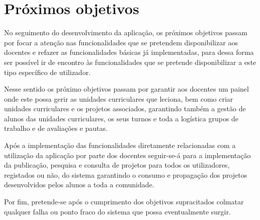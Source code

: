 \section{Próximos objetivos}
No seguimento do desenvolvimento da aplicação, os próximos objetivos passam por focar a atenção nas funcionalidades que se pretendem disponibilizar aos docentes e refazer as funcionalidades básicas já implementadas, para dessa forma ser possível ir de encontro às funcionalidades que se pretende disponibilizar a este tipo específico de utilizador.

Nesse sentido os próximo objetivos passam por garantir aos docentes um painel onde este possa gerir as unidades curriculares que leciona, bem como criar unidades curriculares e os projetos associados, garantindo também a gestão de alunos das unidades curriculares, os seus turnos e toda a logística grupos de trabalho e de avaliações e pautas.

Após a implementação das funcionalidades diretamente relacionadas com a utilização da aplicação por parte dos docentes seguir-se-á para a implementação da publicação, pesquisa e consulta de projetos para todos os utilizadores, registados ou não, do sistema garantindo o consumo e propagação dos projetos desenvolvidos pelos alunos a toda a comunidade.

Por fim, pretende-se após o cumprimento dos objetivos supracitados colmatar qualquer falha ou ponto fraco do sistema que possa eventualmente surgir.
\newpage
